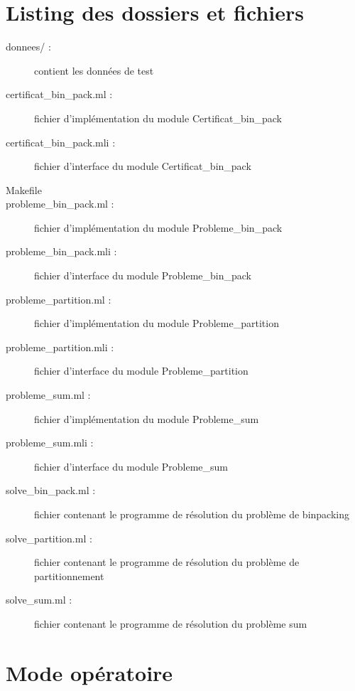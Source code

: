 \section*{Listing des dossiers et fichiers}
\begin{description}
	\item[donnees/ :] contient les données de test
	\item[certificat\_bin\_pack.ml :] fichier d'implémentation du module Certificat\_bin\_pack
	\item[certificat\_bin\_pack.mli :] fichier d'interface du module Certificat\_bin\_pack
	\item[Makefile]
	\item[probleme\_bin\_pack.ml :] fichier d'implémentation du module Probleme\_bin\_pack
	\item[probleme\_bin\_pack.mli :] fichier d'interface du module Probleme\_bin\_pack
	\item[probleme\_partition.ml :] fichier d'implémentation du module Probleme\_partition
	\item[probleme\_partition.mli :] fichier d'interface du module Probleme\_partition
	\item[probleme\_sum.ml :] fichier d'implémentation du module Probleme\_sum
	\item[probleme\_sum.mli :] fichier d'interface du module Probleme\_sum
	\item[solve\_bin\_pack.ml :] fichier contenant le programme de résolution du problème de binpacking
	\item[solve\_partition.ml :] fichier contenant le programme de résolution du problème de partitionnement
	\item[solve\_sum.ml :] fichier contenant le programme de résolution du problème sum
\end{description}

\section*{Mode opératoire}


